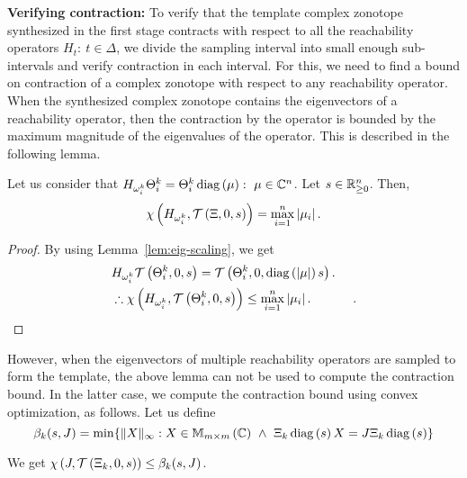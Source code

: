 {\bf Verifying contraction:} To verify that the template complex
zonotope synthesized in the first stage contracts with respect to all
the reachability operators $H_t:~t\in\Delta$, we divide the sampling
interval into small enough sub-intervals and verify contraction in
each interval.  For this, we need to find a bound on contraction of a
complex zonotope with respect to any reachability operator.  When the
synthesized complex zonotope contains the eigenvectors of a
reachability operator, then the contraction by the operator is bounded
by the maximum magnitude of the eigenvalues of the operator.  This is
described in the following lemma.
%
\begin{lemma}
Let us consider that
$H_{\omega_i^k}\Theta_i^k=\Theta^k_i\operatorname{diag}\left(\mu\right):~\mu\in\mathbb{C}^n$.
Let $s\in\mathbb{R}_{\geq 0}^n$.  Then,
%
\[
\chi\left(H_{\omega^k_i},\mathit{\operatorname{\mathcal{T}}}\left(\Xi,0,s\right)\right)=\max_{i=1}^n\left|\mu_i\right|.
\]
%
\end{lemma}
%
\begin{proof}
  By using Lemma~\ref{lem:eig-scaling}, we get
%
\begin{align*}
&
 H_{\omega^k_i}\mathit{\operatorname{\mathcal{T}}}\left(\Theta^k_i,0,s\right) =
 \mathit{\operatorname{\mathcal{T}}}\left(\Theta^k_i,0,\operatorname{diag}\left(\left|\mu\right|\right){s}\right).\\
& \therefore  \chi\left(H_{\omega^k_i},\mathit{\operatorname{\mathcal{T}}}\left(\Theta^k_i,0,s\right)\right)\leq\max_{i=1}^n\left|\mu_i\right|.~\hspace{3em}\qedhere.
\end{align*}
\end{proof}
%
However, when the eigenvectors of multiple reachability operators are
sampled to form the template, the above lemma can not be used to
compute the contraction bound.  In the latter case, we compute the
contraction bound using convex optimization, as follows.  Let us
define
\[\beta_k(s,J)=\min\{\|X\|_\infty:X\in\mathbb{M}_{m\times m}\left(\mathbb{C}\right)~\wedge~
\Xi_k\operatorname{diag}\left(s\right)X=J\Xi_k\operatorname{diag}\left(s\right)\}\] 
%
\begin{lemma}\label{lem:contLin}
We get $\chi\left(J,\mathit{\operatorname{\mathcal{T}}}\left(\Xi_k,0,s\right)\right)\leq \beta_k(s,J)$.
%
\end{lemma}
%
